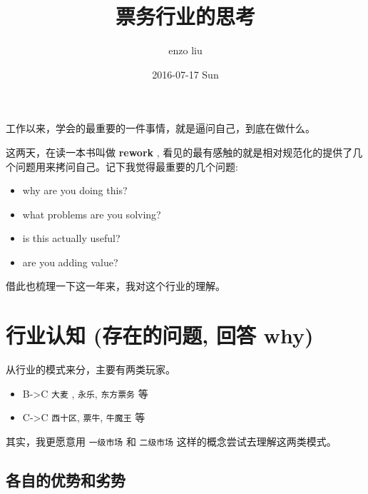 \documentclass[11pt,a4paper]{article}
\author{enzo liu}
\date{2016-07-17 Sun}
\title{票务行业的思考}
\begin{document}
\maketitle
\tableofcontents

工作以来，学会的最重要的一件事情，就是逼问自己，到底在做什么。

这两天，在读一本书叫做  \textbf{rework} , 看见的最有感触的就是相对规范化的提供了几个问题用来拷问自己。记下我觉得最重要的几个问题:

\begin{itemize}
\item why are you doing this?
\item what problems are you solving?
\item is this actually useful?
\item are you adding value?
\end{itemize}

借此也梳理一下这一年来，我对这个行业的理解。

\section*{行业认知 (存在的问题, 回答 why)}
\label{sec:orgheadline2}

从行业的模式来分，主要有两类玩家。

\begin{itemize}
\item B->C \texttt{大麦} , \texttt{永乐}, \texttt{东方票务} 等
\item C->C \texttt{西十区}, \texttt{票牛}, \texttt{牛魔王} 等
\end{itemize}

其实，我更愿意用 \texttt{一级市场} 和 \texttt{二级市场} 这样的概念尝试去理解这两类模式。

\subsection*{各自的优势和劣势}
\label{sec:orgheadline1}
\end{document}
